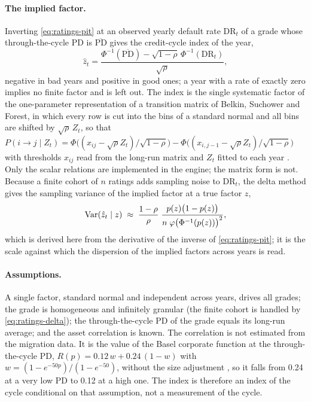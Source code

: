 \paragraph{The implied factor.} Inverting \cref{eq:ratings-pit} at an observed yearly default rate $\mathrm{DR}_t$ of a grade whose through-the-cycle PD is $\overline{\mathrm{PD}}$ gives the credit-cycle index of the year,
\begin{equation}
\hat z_t=\frac{\Phi^{-1}(\overline{\mathrm{PD}})-\sqrt{1-\rho}\,\Phi^{-1}(\mathrm{DR}_t)}{\sqrt{\rho}},
\label{eq:ratings-implied}
\end{equation}
negative in bad years and positive in good ones; a year with a rate of exactly zero implies no finite factor and is left out. The index is the single systematic factor of the one-parameter representation of a transition matrix of Belkin, Suchower and Forest, in which every row is cut into the bins of a standard normal and all bins are shifted by $\sqrt{\rho}\,Z_t$, so that $P(i\to j\mid Z_t)=\Phi\bigl((x_{ij}-\sqrt{\rho}Z_t)/\sqrt{1-\rho}\bigr)-\Phi\bigl((x_{i,j-1}-\sqrt{\rho}Z_t)/\sqrt{1-\rho}\bigr)$ with thresholds $x_{ij}$ read from the long-run matrix and $Z_t$ fitted to each year \citep{ratings:belkin1998}. Only the scalar relations are implemented in the engine; the matrix form is not. Because a finite cohort of $n$ ratings adds sampling noise to $\mathrm{DR}_t$, the delta method gives the sampling variance of the implied factor at a true factor $z$,
\begin{equation}
\operatorname{Var}(\hat z_t\mid z)\;\approx\;\frac{1-\rho}{\rho}\;\frac{p(z)\bigl(1-p(z)\bigr)}{n\;\varphi\bigl(\Phi^{-1}(p(z))\bigr)^{2}},
\label{eq:ratings-delta}
\end{equation}
which is derived here from the derivative of the inverse of \cref{eq:ratings-pit}; it is the scale against which the dispersion of the implied factors across years is read.

\paragraph{Assumptions.} A single factor, standard normal and independent across years, drives all grades; the grade is homogeneous and infinitely granular (the finite cohort is handled by \cref{eq:ratings-delta}); the through-the-cycle PD of the grade equals its long-run average; and the asset correlation is known. The correlation is not estimated from the migration data. It is the value of the Basel corporate function at the through-the-cycle PD, $R(p)=0.12\,w+0.24\,(1-w)$ with $w=(1-e^{-50p})/(1-e^{-50})$, without the size adjustment \citep{ratings:bcbs2005}, so it falls from 0.24 at a very low PD to 0.12 at a high one. The index is therefore an index of the cycle conditional on that assumption, not a measurement of the cycle.

